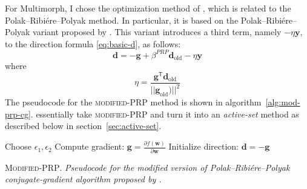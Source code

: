 For Multimorph, I chose the optimization method of \citet{cheng-and-li:2012}, which is related to the Polak--Ribi\'{e}re--Polyak  method. In particular, it is based on the Polak--Ribi\'{e}re--Polyak variant proposed by \citet{zhang-et-al:2006}. This variant
introduces a third term, namely  $-\eta \textbf{y}$, to the direction formula \eqref{eq:basic-d}, as follows:
\begin{equation}\label{eq:mod-d-update}
\textbf{d} = -\textbf{g}  + \beta^{PRP} \textbf{d}_{\text{old}} - \eta \textbf{y}
\end{equation}
where 
\begin{equation}
\label{eq:eta}
\eta = \frac{\textbf{g}^{\textsf{T}}\textbf{d}_{\text{old}}}{{||\textbf{g}_{\text{old}})||}^2}
\end{equation}
The pseudocode for the \textsc{modified-PRP} method is shown in algorithm~\ref{alg:mod-prp-cg}. \citet{cheng-and-li:2012} essentially take \textsc{modified-PRP} and turn it into an \emph{active-set} method as described below in section~\ref{sec:active-set}.
\begin{algorithm}[ht]
	 Choose $\epsilon_1, \epsilon_2$\;
 Compute gradient: $\textbf{g} = \frac{\partial f(\mathbf{w})}{\partial \mathbf{w}} $\;
 Initialize direction: $\mathbf{d} = -\textbf{g} $\; \label{line:init-d-2}
\caption{\textsc{Modified-PRP}. \textit{Pseudocode for the modified version of Polak--Ribi\'{e}re--Polyak conjugate-gradient algorithm proposed by \citet{zhang-et-al:2006}.}} %
\label{alg:mod-prp-cg}
\end{algorithm}

